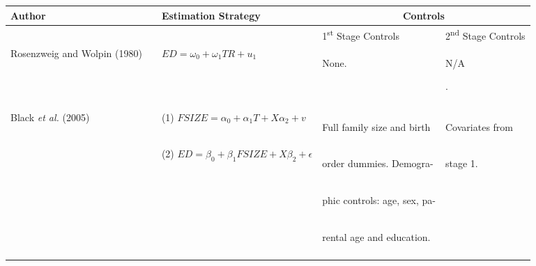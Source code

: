 \documentclass{article}[11pt,subeqn]
\begin{document}
\begin{spacing}{1.25}
\begin{center}
\begin{rotate}{90}
\begin{tabular}{lp{4mm}lll}\toprule
Author& &  Estimation Strategy & \multicolumn{2}{c}{Controls} \\ \midrule
&& & \hspace{5mm}1\textsuperscript{st} Stage Controls & 2\textsuperscript{nd} Stage Controls \\  \cmidrule(r){4-4} \cmidrule{5-5}
Rosenzweig and Wolpin (1980) & &
$ED=\omega_0+\omega_1 TR+u_1$&
\begin{small}None.\end{small}&
\begin{small}N\slash A\end{small}.
\\
\begin{footnotesize}\end{footnotesize}&\begin{footnotesize}\end{footnotesize}&\begin{footnotesize}\end{footnotesize}&\begin{footnotesize}\end{footnotesize}&\begin{footnotesize}\end{footnotesize}\\
\multirow{2}{*}{Black \emph{et al.} (2005)} & &
(1) $FSIZE=\alpha_0 + \alpha_1 T + X\alpha_2 + v$ &
\begin{small}Full family size and  birth \end{small}&
\begin{small}Covariates from\end{small}
\\
& &
(2) $ED=\beta_0+\beta_1 FSIZE + X\beta_2 + \epsilon$ &
\begin{small}order dummies. Demogra-\end{small}  &
\begin{small}stage 1.\end{small}
\\
& & &
\begin{small}phic controls: age, sex, pa-\end{small}&
\\
& & &
\begin{small}rental age and education.\end{small}&
\\
\begin{footnotesize}\end{footnotesize}&\begin{footnotesize}\end{footnotesize}&\begin{footnotesize}\end{footnotesize}&\begin{footnotesize}\end{footnotesize}&\begin{footnotesize}\end{footnotesize}\\

\end{tabular}
\end{rotate}
\end{center}
\end{spacing}
\end{document}
